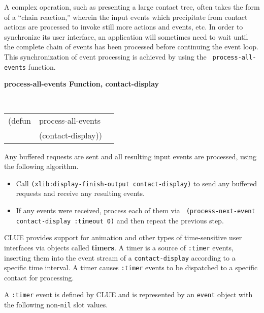 A complex operation, such as
presenting a large contact tree, often takes the form of a ``chain reaction,''
wherein the input events which precipitate from contact actions are processed to
invoke still more actions and events, etc.  In order to synchronize its user
interface, an application will sometimes need to wait until the complete chain
of events has been processed before continuing the event loop.
This synchronization of event processing is achieved by using the {\tt
process-all-events} function.


{\samepage
{\large {\bf process-all-events \hfill Function, contact-display}}
\begin{flushright} \parbox[t]{6.125in}{
\tt
\begin{tabular}{lll}
\raggedright
(defun & process-all-events & \\ 
& (contact-display))
\end{tabular}
\rm

}\end{flushright}}


\begin{flushright} \parbox[t]{6.125in}{
Any buffered requests are sent and all resulting input events are processed,
using the following algorithm.
\begin{itemize}
\item Call {\tt (xlib:display-finish-output contact-display)} to send any
buffered requests and receive any resulting events.
\item If any events were received, process each of them via {\tt
(process-next-event contact-display :timeout 0)} and then repeat the previous
step.  \end{itemize}

}\end{flushright}


CLUE provides support for animation and other types of
time-sensitive user interfaces via objects 
called {\bf timers}.
A timer is a source of {\tt :timer} events, inserting them into the event stream
of a {\tt contact-display} according to a specific time interval. A timer causes
{\tt :timer} events to be dispatched to a specific contact for processing.

A {\tt :timer} event is
defined by CLUE and is represented by an {\tt event} object with the following
non-{\tt nil} slot values.

